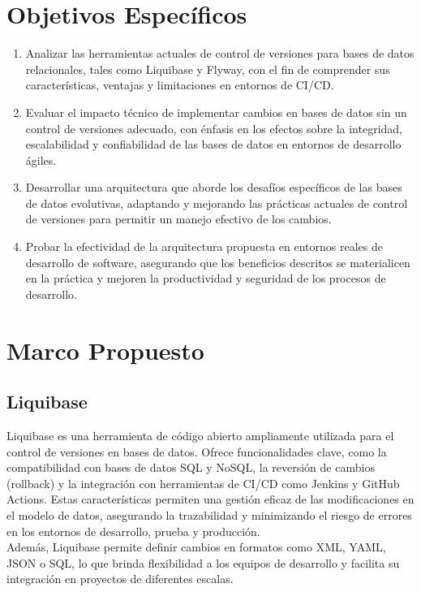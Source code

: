 \documentclass{IEEEtran}
\begin{document}
\section{Objetivos Específicos}
\begin{enumerate}
    \item Analizar las herramientas actuales de control de versiones para bases de datos relacionales, tales como Liquibase y Flyway, con el fin de comprender sus características, ventajas y limitaciones en entornos de CI/CD.
    \item Evaluar el impacto técnico de implementar cambios en bases de datos sin un control de versiones adecuado, con énfasis en los efectos sobre la integridad, escalabilidad y confiabilidad de las bases de datos en entornos de desarrollo ágiles.
    \item Desarrollar una arquitectura que aborde los desafíos específicos de las bases de datos evolutivas, adaptando y mejorando las prácticas actuales de control de versiones para permitir un manejo efectivo de los cambios.
    \item Probar la efectividad de la arquitectura propuesta en entornos reales de desarrollo de software, asegurando que los beneficios descritos se materialicen en la práctica y mejoren la productividad y seguridad de los procesos de desarrollo.
\end{enumerate}

\section{Marco Propuesto}
\subsection{Liquibase}
Liquibase es una herramienta de código abierto ampliamente utilizada para el control de versiones en bases de datos. Ofrece funcionalidades clave, como la compatibilidad con bases de datos SQL y NoSQL, la reversión de cambios (rollback) y la integración con herramientas de CI/CD como Jenkins y GitHub Actions. Estas características permiten una gestión eficaz de las modificaciones en el modelo de datos, asegurando la trazabilidad y minimizando el riesgo de errores en los entornos de desarrollo, prueba y producción.\\ Además, Liquibase permite definir cambios en formatos como XML, YAML, JSON o SQL, lo que brinda flexibilidad a los equipos de desarrollo y facilita su integración en proyectos de diferentes escalas.
\end{document}
